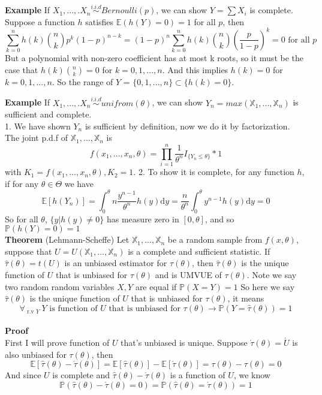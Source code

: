\textbf{Example} If $X_1, ..., .X_n \overset{i.i.d}{\sim} Bernoulli(p)$, we can show $Y = \sum X_i$ is complete. Suppose a function $h$ satisfies $\mathbb{E}( h(Y) = 0 ) = 1$ for all $p$, then
$$\sum_{k=0}^n h(k) {n \choose k} p^k(1-p)^{n-k} = (1-p)^n\sum_{k=0}^n h(k) {n \choose k} (\frac{p}{1-p})^k = 0 \text{ for all } p$$
But a polynomial with non-zero coefficient has at most k roots, so it must be the case that $h(k) {n \choose k} = 0 $ for $k = 0, 1, ..., n$. And this implies $h(k)= 0 $ for $k = 0, 1, ..., n$. So the range of $Y$ = $\{0, 1, ..., n \} \subset \{h(k)= 0\}$.

\textbf{Example} If $X_1, ..., .X_n \overset{i.i.d}{\sim} unifrom(\theta)$, we can show $Y_n = max(\mathbb{X}_1, ..., \mathbb{X}_n)$ is sufficient and complete.\\
1. We have shown $Y_n$ is sufficient by definition, now we do it by factorization. The joint p.d.f of $\mathbb{X}_1, ..., \mathbb{X}_n$ is
$$f(x_1, ..., x_n, \theta) = \prod_{i=1}^n \frac{1}{\theta^n} I_{\{Y_n \leq \theta\}} * 1$$
with $K_1 = f(x_1, ..., x_n, \theta), K_2 = 1$.
2. To show it is complete, for any function $h$, if for any $\theta\in\Theta$ we have
$$\mathbb{E}[ h(Y_n) ] = \int_0^\theta n\frac{y^{n-1}}{\theta^n}h(y) \mathrm{d}y = \frac{n}{\theta^n} \int_0^\theta y^{n-1}h(y) \mathrm{d}y = 0$$
So for all $\theta$, $\{ y | h(y) \neq 0 \}$ has measure zero in $[0, \theta]$, and so $\mathbb{P}( h(Y) = 0 ) = 1$\\

\textbf{Theorem} (Lehmann-Scheffe) Let $\mathbb{X}_1, ..., \mathbb{X}_n$ be a random sample from $f(x, \theta)$, suppose that $U = U(\mathbb{X}_1, ..., \mathbb{X}_n)$ is a complete and sufficient statistic. If $\hat{\tau}(\theta) = t(U)$ is an unbiased estimator for $\tau(\theta)$, then $\hat{\tau}(\theta)$ is the unique function of $U$ that is unbiased for $\tau(\theta)$ and is UMVUE of $\tau(\theta)$. Note we say two random random variables $X, Y$ are equal if $\mathbb{P}( X = Y ) = 1$ So here we say $\hat{\tau}(\theta)$ is the unique function of $U$ that is unbiased for $\tau(\theta)$, it means
$$\forall_{\text{ r.v } Y } \ Y \text{ is function of } U \text{ that is unbiased for } \tau(\theta) \to \mathbb{P}(Y = \hat{\tau}(\theta)) = 1$$\\

\textbf{Proof}\\
First I will prove function of $U$ that's unbiased is unique. Suppose $\acute{\tau}(\theta) = \acute{U}$ is also unbiased for $\tau(\theta)$, then
$$\mathbb{E}[ \hat{\tau}(\theta) - \acute{\tau}(\theta) ] = \mathbb{E}[ \hat{\tau}(\theta) ] - \mathbb{E}[ \acute{\tau}(\theta) ] = \tau(\theta) - \tau(\theta) = 0$$
And since $U$ is complete and $\hat{\tau}(\theta) - \acute{\tau}(\theta)$ is a function of $U$, we know 
$$\mathbb{P}( \hat{\tau}(\theta) - \acute{\tau}(\theta) = 0 ) = \mathbb{P}( \hat{\tau}(\theta) = \acute{\tau}(\theta) ) = 1$$

